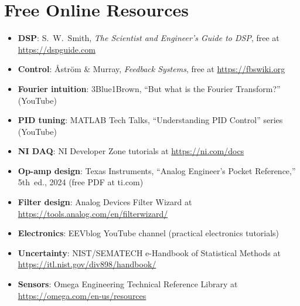 \section*{Free Online Resources}
\begin{itemize}[leftmargin=1.5em]
\item \textbf{DSP}: S.~W.~Smith, \emph{The Scientist and Engineer's Guide to DSP}, free at \url{https://dspguide.com}
\item \textbf{Control}: {\AA}str{\"o}m \& Murray, \emph{Feedback Systems}, free at \url{https://fbswiki.org}
\item \textbf{Fourier intuition}: 3Blue1Brown, ``But what is the Fourier Transform?'' (YouTube)
\item \textbf{PID tuning}: MATLAB Tech Talks, ``Understanding PID Control'' series (YouTube)
\item \textbf{NI DAQ}: NI Developer Zone tutorials at \url{https://ni.com/docs}
\item \textbf{Op-amp design}: Texas Instruments, ``Analog Engineer's Pocket Reference,'' 5th~ed., 2024 (free PDF at ti.com)
\item \textbf{Filter design}: Analog Devices Filter Wizard at \url{https://tools.analog.com/en/filterwizard/}
\item \textbf{Electronics}: EEVblog YouTube channel (practical electronics tutorials)
\item \textbf{Uncertainty}: NIST/SEMATECH e-Handbook of Statistical Methods at \url{https://itl.nist.gov/div898/handbook/}
\item \textbf{Sensors}: Omega Engineering Technical Reference Library at \url{https://omega.com/en-us/resources}
\end{itemize}
